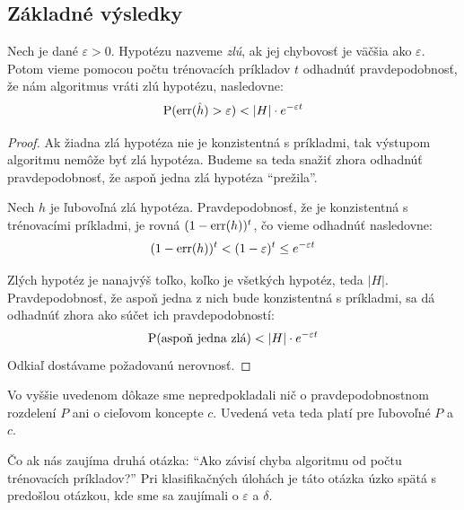 \subsection{Základné výsledky}

\begin{theorem} \label{thm:badhypobound}
  Nech je dané $\varepsilon > 0$. Hypotézu nazveme \emph{zlú}, ak jej
  chybovosť je väčšia ako $\varepsilon$. Potom vieme pomocou počtu
  trénovacích príkladov $t$ odhadnúť pravdepodobnosť, že nám algoritmus
  vráti zlú hypotézu, nasledovne:
  $$\operatorname*{\mathrm{P}}(\mathrm{err}(\hat{h}) > \varepsilon) < |H| \cdot e^{-\varepsilon t}$$
\end{theorem}
\begin{proof}
  Ak žiadna zlá hypotéza nie je konzistentná s príkladmi, tak výstupom
  algoritmu nemôže byť zlá hypotéza. Budeme sa teda snažiť zhora odhadnúť
  pravdepodobnosť, že aspoň jedna zlá hypotéza ``prežila''.
  
  Nech $h$ je ľubovoľná zlá hypotéza. Pravdepodobnosť, že je konzistentná
  s trénovacími príkladmi, je rovná $(1 - \mathrm{err}(h))^t$, čo vieme odhadnúť
  nasledovne:
  $$(1 - \mathrm{err}(h))^t < (1 - \varepsilon)^t \leq e^{-\varepsilon t}$$
  
  Zlých hypotéz je nanajvýš toľko, koľko je všetkých hypotéz, teda
  $|H|$. Pravdepodobnosť, že aspoň jedna z nich bude konzistentná s
  príkladmi, sa dá odhadnúť zhora ako súčet ich pravdepodobností:
  $$\operatorname*{\mathrm{P}}(\text{aspoň jedna zlá}) < |H| \cdot e^{-\varepsilon t}$$
  Odkiaľ dostávame požadovanú nerovnosť.
\end{proof}
\begin{remark}
  Vo vyššie uvedenom dôkaze sme nepredpokladali nič o pravdepodobnostnom
  rozdelení $P$ ani o cieľovom koncepte $c$. Uvedená veta teda platí
  pre ľubovoľné $P$ a $c$.
\end{remark}

Čo ak nás zaujíma druhá otázka: ``Ako závisí chyba algoritmu od počtu
trénovacích príkladov?'' Pri klasifikačných úlohách je táto otázka úzko
spätá s predošlou otázkou, kde sme sa zaujímali o $\varepsilon$ a $\delta$.

